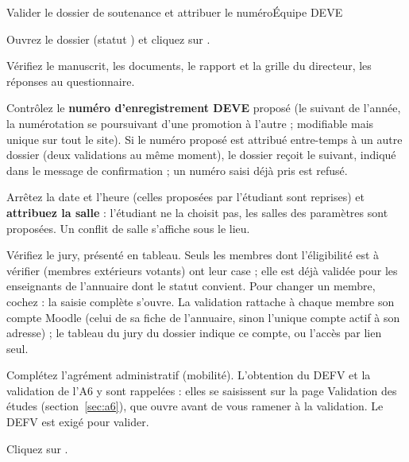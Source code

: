 \documentclass[11pt,a4paper]{article}
\begin{document}

\begin{procedure}{Valider le dossier de soutenance et attribuer le numéro}{Équipe DEVE}
\begin{etapes}
  \item Ouvrez le dossier (statut ) et cliquez sur .
  \item Vérifiez le manuscrit, les documents, le rapport et la grille du
        directeur, les réponses au questionnaire.
  \item Contrôlez le \textbf{numéro d'enregistrement DEVE} proposé (le
        suivant de l'année, la numérotation se poursuivant d'une promotion à
        l'autre ; modifiable mais unique sur tout le site). Si le numéro
        proposé est attribué entre-temps à un autre dossier (deux validations
        au même moment), le dossier reçoit le suivant, indiqué dans le message
        de confirmation ; un numéro saisi déjà pris est refusé.
  \item Arrêtez la date et l'heure (celles proposées par l'étudiant sont
        reprises) et \textbf{attribuez la salle} : l'étudiant ne la choisit
        pas, les salles des paramètres sont proposées. Un conflit de salle
        s'affiche sous le lieu.
  \item Vérifiez le jury, présenté en tableau. Seuls les membres dont
        l'éligibilité est à vérifier (membres extérieurs votants) ont leur case
         ; elle est déjà validée
        pour les enseignants de l'annuaire dont le statut convient. Pour changer
        un membre, cochez  : la saisie
        complète s'ouvre. La validation rattache à chaque membre son compte
        Moodle (celui de sa fiche de l'annuaire, sinon l'unique compte actif à
        son adresse) ; le tableau du jury du dossier indique ce compte, ou
        l'accès par lien seul.
  \item Complétez l'agrément administratif (mobilité). L'obtention du DEFV et
        la validation de l'A6 y sont rappelées : elles se saisissent sur la page
        \og Validation des études\fg{} (section~\ref{sec:a6}), que
         ouvre avant de vous ramener à la validation. Le
        DEFV est exigé pour valider.
  \item Cliquez sur .
\end{etapes}
\end{procedure}
\end{document}
